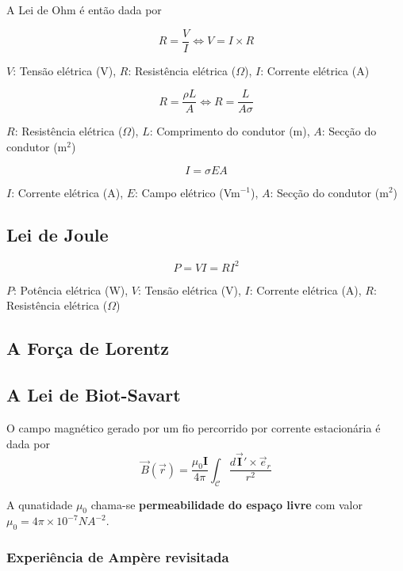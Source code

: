 \documentclass[11pt]{article}
\begin{document}
A Lei de Ohm é então dada por

\[ \displaystyle R=\frac{V}{I} \Leftrightarrow V=I\times R \]
\begin{center}
    $V$: Tensão elétrica (V),
    $R$: Resistência elétrica ($\Omega$), 
    $I$: Corrente elétrica (A)
\end{center}

\[ \displaystyle R = \frac{\rho L}{A} \Leftrightarrow R=\frac{L}{A\sigma} \]
\begin{center}
    $R$: Resistência elétrica ($\Omega$),
    $L$: Comprimento do condutor (m),
    $A$: Secção do condutor (m$^2$)
\end{center}

\[ \displaystyle I = \sigma EA \]
\begin{center}
    $I$: Corrente elétrica (A),
    $E$: Campo elétrico (Vm$^{-1}$),
    $A$: Secção do condutor (m$^2$)
\end{center}

\subsection{Lei de Joule}

\[ P=VI=RI^2 \]
\begin{center}
    $P$: Potência elétrica (W),
    $V$: Tensão elétrica (V),
    $I$: Corrente elétrica (A),
    $R$: Resistência elétrica ($\Omega$)
\end{center}

\subsection{A Força de Lorentz}

\subsection{A Lei de Biot-Savart}

O campo magnético gerado por um fio percorrido por corrente estacionária é dada por
\[ \displaystyle \overrightarrow{B}(\overrightarrow{r}) = \frac{\mu_0\mathbf{I}}{4\pi} \int_{\mathcal{C}}\frac{d\overrightarrow{\mathbf{I}}'\times \overrightarrow{e}_r}{r^2} \]

A qunatidade $\mu_0$ chama-se \textbf{permeabilidade do espaço livre} com valor $\mu_0 = 4\pi \times 10^{-7} N A^{-2}$.

\subsubsection{Experiência de Ampère revisitada}
\end{document}
